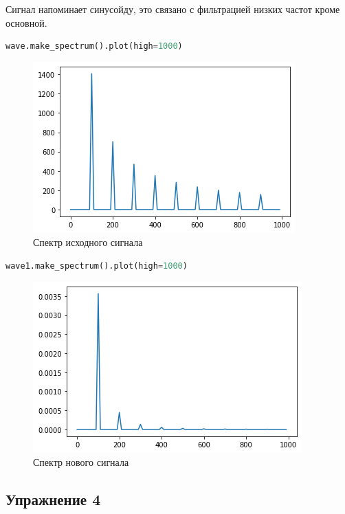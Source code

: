 Сигнал напоминает синусойду, это связано с фильтрацией низких частот кроме основной.

\begin{lstlisting}[language=Python]
wave.make_spectrum().plot(high=1000)
\end{lstlisting}
\begin{figure}[H]
	\begin{center}
		\includegraphics[scale=1]{fig/lab09/lab09_9.png}
		\caption{Спектр исходного сигнала}
	\end{center}
\end{figure}

\begin{lstlisting}[language=Python]
wave1.make_spectrum().plot(high=1000)
\end{lstlisting}
\begin{figure}[H]
	\begin{center}
		\includegraphics[scale=1]{fig/lab09/lab09_10.png}
		\caption{Спектр нового сигнала}
	\end{center}
\end{figure}


\subsection{Упражнение 4}

